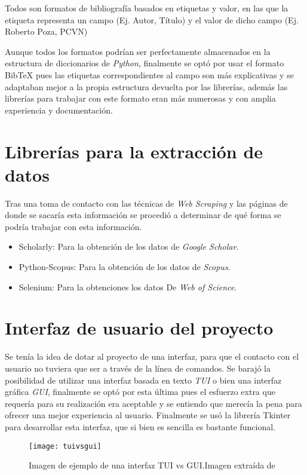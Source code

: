 Todos son formatos de bibliografía basados en etiquetas y valor, en las que la etiqueta representa un campo (Ej. Autor, Título) y el valor de dicho campo (Ej. Roberto Poza, PCVN)

 	Aunque todos los formatos podrían ser perfectamente almacenados en la estructura de diccionarios de \emph {Python}, finalmente se optó por usar el formato BibTeX pues las etiquetas correspondientes al campo son más explicativas y se adaptaban mejor a la propia estructura devuelta por las librerías, además las librerías para trabajar con este formato eran más numerosas y con amplia experiencia y documentación.

\section{Librerías para la extracción de datos}
Tras una toma de contacto con las técnicas de \emph{Web Scraping} y las páginas de donde se sacaría esta información se procedió a determinar de qué forma se podría trabajar con esta información.
\begin{itemize}
	\item Scholarly: Para la obtención de los datos de \emph{Google Scholar}\cite{scholarly}.
	\item Python-Scopus: Para la obtención de los datos de \emph{Scopus}\cite{pyscopus}.
	\item Selenium: Para la obtenciones los datos De \emph{Web of Science}\cite{selenium}.
\end{itemize}

\section{Interfaz de usuario del proyecto}
Se tenía la idea de dotar al proyecto de una interfaz, para que el contacto con el usuario no tuviera que ser a través de  la línea de comandos. Se barajó la posibilidad de utilizar una interfaz basada en texto \emph{TUI} o bien una interfaz gráfica \emph{GUI}, finalmente se optó por esta última pues el esfuerzo extra que requería para su realización era aceptable y se entiendo que merecía la pena para ofrecer una mejor experiencia al usuario.
 	Finalmente se usó la librería Tkinter para desarrollar esta interfaz, que si bien es sencilla es bastante funcional.
\begin{figure}[H]
	\centering
	\texttt{[image: tuivsgui]}
	\caption{Imagen de ejemplo de una interfaz TUI vs GUI.Imagen extraída de \cite{tui_vs_gui}}
	\label{fig:tuivsgui}
\end{figure}
